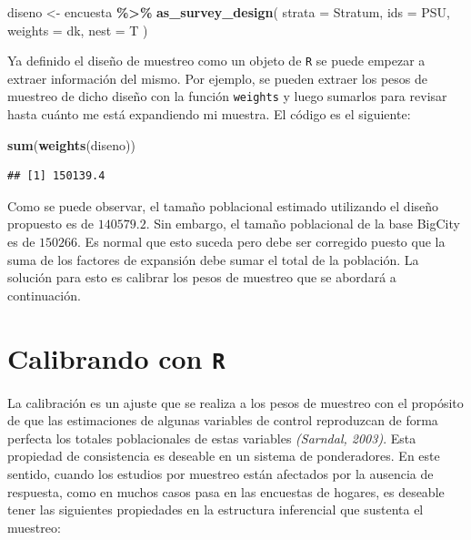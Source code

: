 \documentclass[
  spanish,
  12pt,
]{book}
\newenvironment{Shaded}{\begin{snugshade}}{\end{snugshade}}
\newcommand{\AttributeTok}[1]{\textcolor[rgb]{0.13,0.29,0.53}{#1}}
\newcommand{\FunctionTok}[1]{\textcolor[rgb]{0.13,0.29,0.53}{\textbf{#1}}}
\newcommand{\NormalTok}[1]{#1}
\newcommand{\OtherTok}[1]{\textcolor[rgb]{0.56,0.35,0.01}{#1}}
\newcommand{\SpecialCharTok}[1]{\textcolor[rgb]{0.81,0.36,0.00}{\textbf{#1}}}
\begin{document}
\begin{Shaded}
\begin{Highlighting}[]
\NormalTok{diseno }\OtherTok{\textless{}{-}}\NormalTok{ encuesta }\SpecialCharTok{\%\textgreater{}\%}
  \FunctionTok{as\_survey\_design}\NormalTok{(}
    \AttributeTok{strata =}\NormalTok{ Stratum,}
    \AttributeTok{ids =}\NormalTok{ PSU,}
    \AttributeTok{weights =}\NormalTok{ dk,}
    \AttributeTok{nest =}\NormalTok{ T}
\NormalTok{  )}
\end{Highlighting}
\end{Shaded}

Ya definido el diseño de muestreo como un objeto de \texttt{R} se puede empezar a extraer información del mismo. Por ejemplo, se pueden extraer los pesos de muestreo de dicho diseño con la función \texttt{weights} y luego sumarlos para revisar hasta cuánto me está expandiendo mi muestra. El código es el siguiente:

\begin{Shaded}
\begin{Highlighting}[]
\FunctionTok{sum}\NormalTok{(}\FunctionTok{weights}\NormalTok{(diseno))}
\end{Highlighting}
\end{Shaded}

\begin{verbatim}
## [1] 150139.4
\end{verbatim}

Como se puede observar, el tamaño poblacional estimado utilizando el diseño propuesto es de \(140579.2\). Sin embargo, el tamaño poblacional de la base BigCity es de \(150266\). Es normal que esto suceda pero debe ser corregido puesto que la suma de los factores de expansión debe sumar el total de la población. La solución para esto es calibrar los pesos de muestreo que se abordará a continuación.

\section{\texorpdfstring{Calibrando con \texttt{R}}{Calibrando con R}}\label{calibrando-con-r}

La calibración es un ajuste que se realiza a los pesos de muestreo con el propósito de que las estimaciones de algunas variables de control reproduzcan de forma perfecta los totales poblacionales de estas variables \emph{(Sarndal, 2003)}. Esta propiedad de consistencia es deseable en un sistema de ponderadores. En este sentido, cuando los estudios por muestreo están afectados por la ausencia de respuesta, como en muchos casos pasa en las encuestas de hogares, es deseable tener las siguientes propiedades en la estructura inferencial que sustenta el muestreo:
\end{document}
